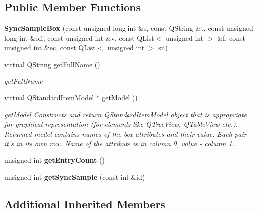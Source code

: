 \subsection*{Public Member Functions}
\begin{DoxyCompactItemize}
\item 
\hypertarget{class_sync_sample_box_a887ff0727aead5bca9e437eaedd116ae}{{\bfseries Sync\-Sample\-Box} (const unsigned long int \&s, const Q\-String \&t, const unsigned long int \&off, const unsigned int \&v, const Q\-List$<$ unsigned int $>$ \&f, const unsigned int \&ec, const Q\-List$<$ unsigned int $>$ sn)}\label{class_sync_sample_box_a887ff0727aead5bca9e437eaedd116ae}

\item 
virtual Q\-String \hyperlink{class_sync_sample_box_a9d3ab6e8730ca0cca633b7920e131413}{get\-Full\-Name} ()
\begin{DoxyCompactList}\small\item\em get\-Full\-Name \end{DoxyCompactList}\item 
virtual Q\-Standard\-Item\-Model $\ast$ \hyperlink{class_sync_sample_box_afe48e1f32651b46329c3834e642b18f9}{get\-Model} ()
\begin{DoxyCompactList}\small\item\em get\-Model Constructs and return Q\-Standard\-Item\-Model object that is appropriate for graphical representation (for elements like Q\-Tree\-View, Q\-Table\-View etc.). Returned model contains names of the box attributes and their value. Each pair it's in its own row. Name of the attribute is in column 0, value -\/ column 1. \end{DoxyCompactList}\item 
\hypertarget{class_sync_sample_box_aab6ef3f0af9cf34349af836d7b17a403}{unsigned int {\bfseries get\-Entry\-Count} ()}\label{class_sync_sample_box_aab6ef3f0af9cf34349af836d7b17a403}

\item 
\hypertarget{class_sync_sample_box_a75d88ad1556051afa1b03f404be13cbf}{unsigned int {\bfseries get\-Sync\-Sample} (const int \&id)}\label{class_sync_sample_box_a75d88ad1556051afa1b03f404be13cbf}

\end{DoxyCompactItemize}
\subsection*{Additional Inherited Members}


